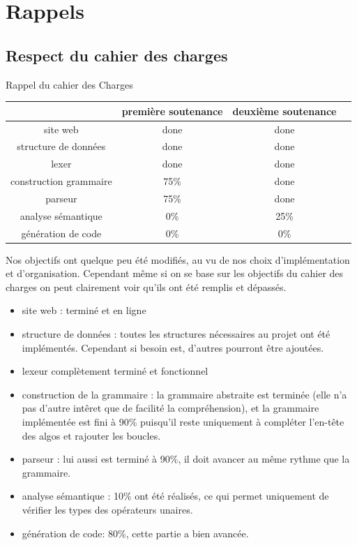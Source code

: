 \documentclass[12pt,a4paper]{report}
\newcommand{\mychapter}[2]{
    \setcounter{chapter}{#1}
    \setcounter{section}{0}
    \chapter*{#2}
    \addcontentsline{toc}{chapter}{#2}
}
\begin{document}
\newpage

\mychapter{3}{Rappels}
\section{Respect du cahier des charges}

Rappel du cahier des Charges

\begin{center}
\begin{tabular}{|c|c|c|c|}
\hline
                        & première soutenance & deuxième soutenance \\ \hline
site web                & done                & done                \\
\hline
structure de données     & done                & done                \\
\hline
lexer                   & done                & done                 \\
\hline
construction grammaire   & 75\%                & done                \\
\hline
parseur                 & 75\%                & done                \\
\hline
analyse sémantique      & 0\%                 & 25\%               \\
\hline
génération de code      & 0\%                 & 0\%                 \\
\hline

\end{tabular}
\end{center} \hfill 

Nos objectifs ont quelque peu été modifiés, au vu de nos choix d'implémentation et d'organisation. Cependant même si on se base sur les objectifs du cahier des charges on peut clairement voir qu'ils ont été remplis et dépassés. 

\begin{itemize}
\item site web : terminé et en ligne
\item structure de données : toutes les structures nécessaires au projet ont été implémentés. Cependant si besoin est, d'autres pourront être ajoutées.
\item lexeur complètement terminé et fonctionnel
\item construction de la grammaire : la grammaire abstraite est terminée (elle n'a pas d'autre intêret que de facilité la compréhension), et la grammaire implémentée est fini à 90\% puisqu'il reste uniquement à compléter l'en-tête des algos et rajouter les boucles.

\item parseur : lui aussi est terminé à 90\%, il doit avancer au même rythme que la grammaire.
\item analyse sémantique : 	10\% ont été réalisés, ce qui permet uniquement de vérifier les types des opérateurs unaires.
\item génération de code: 80\%, cette partie a bien avancée.
\end{itemize} 
\end{document}
